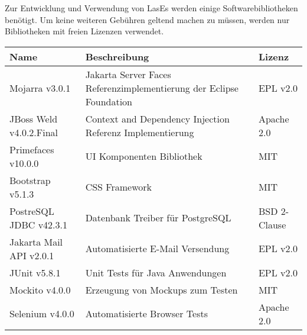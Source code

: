 
Zur Entwicklung und Verwendung von LasEs werden einige Softwarebibliotheken benötigt. Um keine weiteren Gebühren geltend machen zu müssen, werden nur Bibliotheken mit freien Lizenzen verwendet.

\begin{table}[H]
	\centering
	\begin{tabularx}{\columnwidth}{|l|X|l|}
		\hline
		Name & Beschreibung & Lizenz \\
		\hline\hline
		Mojarra v3.0.1 & Jakarta Server Faces Referenzimplementierung der Eclipse Foundation & EPL v2.0 \\
		\hline
		JBoss Weld v4.0.2.Final & Context and Dependency Injection Referenz Implementierung & Apache 2.0 \\
		\hline
		Primefaces v10.0.0 & UI Komponenten Bibliothek & MIT \\
		\hline
		Bootstrap v5.1.3 & CSS Framework & MIT \\
		\hline
		PostreSQL JDBC v42.3.1 & Datenbank Treiber für PostgreSQL & BSD 2-Clause \\
		\hline
		Jakarta Mail API v2.0.1 & Automatisierte E-Mail Versendung & EPL v2.0 \\
		\hline
		JUnit v5.8.1 & Unit Tests für Java Anwendungen & EPL v2.0 \\
		\hline
		Mockito v4.0.0 & Erzeugung von Mockups zum Testen & MIT \\
		\hline
		Selenium v4.0.0 & Automatisierte Browser Tests & Apache 2.0 \\
		\hline



	\end{tabularx}
\end{table}